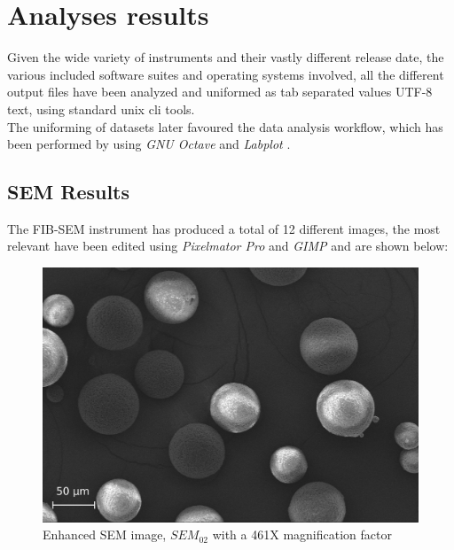 \documentclass{article}
\begin{document}
        \clearpage


      \section{Analyses results\label{analyses_results_general}}

      Given the wide variety of instruments and their vastly different release date, the various included software suites and operating systems involved,
      all the different output files have been analyzed and uniformed as tab separated values UTF-8 text, using standard unix cli tools. \\ 
      
      The uniforming of datasets later favoured the data analysis workflow, which has been performed by using \textit{GNU Octave} \autocites{Octave} and \textit{Labplot} \autocites{Labplot}. \\

      \subsection{SEM Results\label{SEM_analysis_results}}

                
      The FIB-SEM instrument has produced a total of 12 different images, the most relevant have been edited using 
      \textit{Pixelmator Pro} and \textit{GIMP} \autocites{Pixelmator_Pro}{GIMP} and are shown below: \\


          \begin{figure}[h!]
              \centering 
              \includegraphics[width=\textwidth]{Pictures/SEM/Edited/04_02.eps}
              \caption{Enhanced SEM image, $SEM_{02}$ with a 461X magnification factor}
              \label{fig:SEM_02}
          \end{figure}
\end{document}
